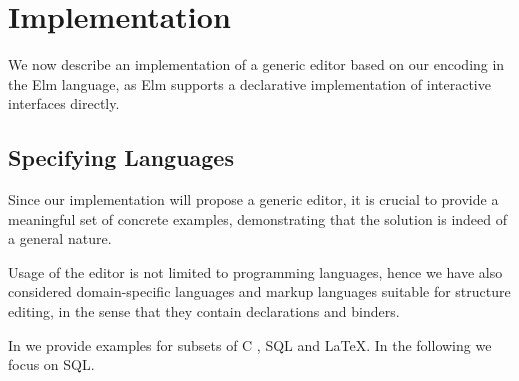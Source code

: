 \documentclass[sigplan,screen]{acmart}
\begin{document}
\section{Implementation}

We now describe an implementation of a generic editor based on our
encoding in the Elm language, as Elm supports a declarative
implementation of interactive interfaces directly.

\subsection{Specifying Languages}

Since our implementation will propose a generic editor, it is crucial
to provide a meaningful set of concrete examples, demonstrating that
the solution is indeed of a general nature.  %


Usage of the editor is not limited to programming languages, hence we
have also considered domain-specific languages and markup languages
suitable for structure editing, in the sense that they contain
declarations and binders.

In \cite{sunemsc} we provide examples for subsets of C
\cite{c-iso-standard}, SQL\cite{postgresql-about} and
\LaTeX\cite{latex-about}. In the following we focus on SQL.



\end{document}
